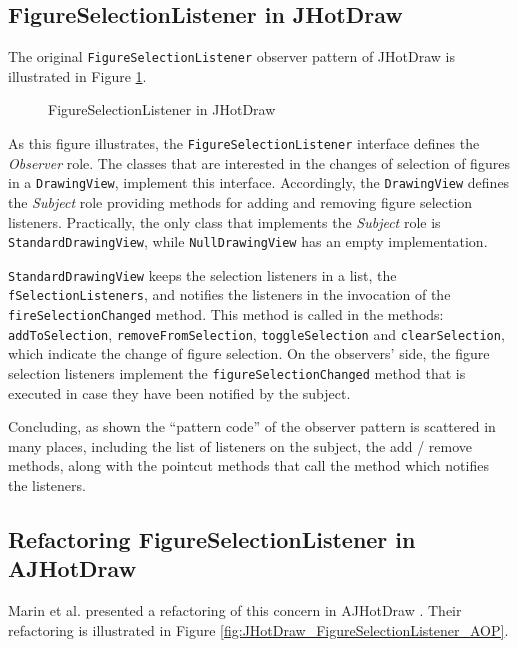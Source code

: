 \subsection{FigureSelectionListener in JHotDraw}
The original \texttt{FigureSelectionListener} observer pattern of JHotDraw is illustrated in Figure \ref{fig:JHotDraw_FigureSelectionListener_OOP}.

\begin{figure}[H]
	\centering
  	\caption{FigureSelectionListener in JHotDraw}
  	\label{fig:JHotDraw_FigureSelectionListener_OOP}
\end{figure}

As this figure illustrates, the \texttt{FigureSelectionListener} interface defines the \textit{Observer} role.
The classes that are interested in the changes of selection of figures in a \texttt{DrawingView}, implement this interface.
Accordingly, the \texttt{DrawingView} defines the \textit{Subject} role providing methods for adding and removing figure selection listeners.
Practically, the only class that implements the \textit{Subject} role is \texttt{StandardDrawingView}, while \texttt{NullDrawingView} has an empty implementation.

\texttt{StandardDrawingView} keeps the selection listeners in a list, the \texttt{fSelectionListeners}, and notifies the listeners in the invocation of the \texttt{fireSelectionChanged} method.
This method is called in the methods: \texttt{addToSelection}, \texttt{removeFromSelection}, \texttt{toggleSelection} and \texttt{clearSelection}, which indicate the change of figure selection.
On the observers' side, the figure selection listeners implement the \texttt{figureSelectionChanged} method that is executed in case they have been notified by the subject.

Concluding, as shown the ``pattern code'' of the observer pattern is scattered in many places, including the list of listeners on the subject, the add / remove methods, along with the pointcut methods that call the method which notifies the listeners.

\subsection{Refactoring FigureSelectionListener in AJHotDraw}
Marin et al. presented a refactoring of this concern in AJHotDraw \cite{marin2005approach}. 
Their refactoring is illustrated in Figure \ref{fig:JHotDraw_FigureSelectionListener_AOP}. 


